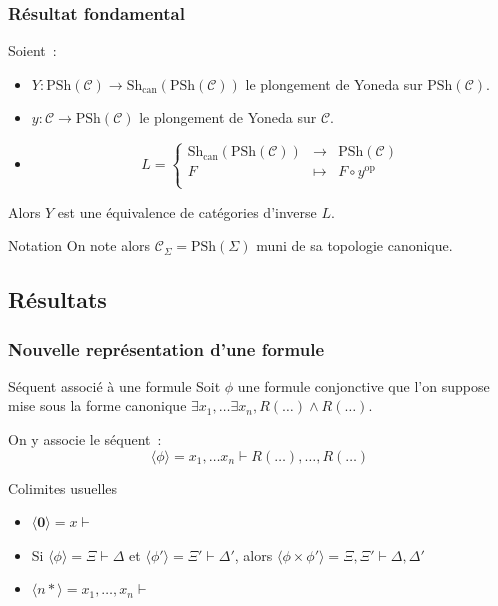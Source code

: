 \documentclass[12pt]{beamer}
\renewcommand\C{\mathscr{C}}
\newcommand\psh{\text{PSh}}
\newcommand\shc{\text{Sh}_\text{can}}
\newcommand{\ml}[1]{\langle{#1}\rangle}
\begin{document}
\begin{frame}
    \frametitle{Résultat fondamental}

    Soient~:\begin{itemize}
        \item $Y : \psh(\C)\rightarrow\shc(\psh(\C))$ le plongement de Yoneda sur
            $\psh(\C)$.
        \item $y : \C\rightarrow\psh(\C)$ le plongement de Yoneda sur $\C$.
        \item \[L = \left\{\begin{array}{ccc}
                 \shc(\psh(\C)) & \rightarrow & \psh(\C) \\
                 F              & \mapsto     & F\circ y^\text{op} \\
            \end{array}\right.\]
    \end{itemize}

    Alors $Y$ est une équivalence de catégories d'inverse $L$.
    \pause

    \begin{exampleblock}{Notation}
        On note alors $\C_\Sigma = \psh(\Sigma)$ muni de sa topologie canonique.
    \end{exampleblock}
\end{frame}

\subsection{Résultats}

\begin{frame}
    \frametitle{Nouvelle représentation d'une formule}

    \begin{block}{Séquent associé à une formule}\label{formSeq}
        Soit $\phi$ une formule conjonctive que l'on suppose mise sous la
        forme canonique $\exists x_1,\dots\exists x_n, R(\dots)\wedge R(\dots)$.
        
        On y associe le séquent~:
        \[\ml{\phi} = x_1,\dots x_n\vdash R(\dots), \dots, R(\dots)\]
    \end{block}
    \pause
    \begin{exampleblock}{Colimites usuelles}\begin{itemize}[<+->]
        \item $\ml{\mathbf{0}} = x\vdash$
        \item Si $\ml{\phi} = \Xi\vdash\Delta$ et $\ml{\phi'} = \Xi'\vdash\Delta'$,
            alors $\ml{\phi\times\phi'} = \Xi,\Xi'\vdash\Delta,\Delta'$
        \item $\ml{n\ast} = x_1,\dots,x_n\vdash$
    \end{itemize}\end{exampleblock}
\end{frame}
\end{document}
